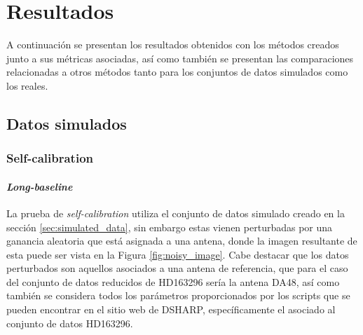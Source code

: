 \chapter{Resultados}
\label{cap:resultados}

A continuación se presentan los resultados obtenidos con los métodos creados junto a sus métricas asociadas, así como también se presentan las comparaciones relacionadas a otros métodos tanto para los conjuntos de datos simulados como los reales. 

\section{Datos simulados}

\subsection{Self-calibration}

\subsubsection{\textit{Long-baseline}}

La prueba de \textit{self-calibration} utiliza el conjunto de datos simulado creado en la sección \ref{sec:simulated_data}, sin embargo estas vienen perturbadas por una ganancia aleatoria que está asignada a una antena, donde la imagen resultante de esta puede ser vista en la Figura \ref{fig:noisy_image}. Cabe destacar que los datos perturbados son aquellos asociados a una antena de referencia, que para el caso del conjunto de datos reducidos de HD163296 sería la antena DA48, así como también se considera todos los parámetros proporcionados por los scripts que se pueden encontrar en el sitio web de DSHARP, específicamente el asociado al conjunto de datos HD163296. 

